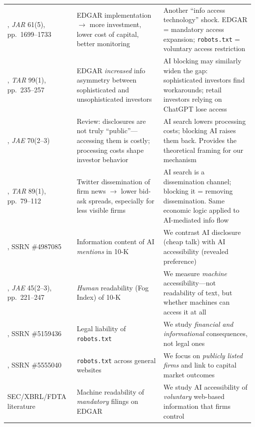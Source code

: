 \documentclass[12pt,a4paper]{article}
\begin{document}
\begin{table}[htbp]
\begin{tabularx}{\textwidth}{p{3.8cm}p{3.2cm}X}
\addlinespace
\citet{GoldsteinYangZuo2023}, \emph{JAR} 61(5), pp.\ 1699--1733 & EDGAR implementation $\to$ more investment, lower cost of capital, better monitoring & Another ``info access technology'' shock. EDGAR = mandatory access expansion; \texttt{robots.txt} = voluntary access restriction \\
\addlinespace
\citet{Gomez2024}, \emph{TAR} 99(1), pp.\ 235--257 & EDGAR \emph{increased} info asymmetry between sophisticated and unsophisticated investors & AI blocking may similarly widen the gap: sophisticated investors find workarounds; retail investors relying on ChatGPT lose access \\
\addlinespace
\citet{BlankespoorDeHaanMarinovic2020}, \emph{JAE} 70(2--3) & Review: disclosures are not truly ``public''---accessing them is costly; processing costs shape investor behavior & AI search lowers processing costs; blocking AI raises them back. Provides the theoretical framing for our mechanism \\
\addlinespace
\citet{BlankespoorMillerWhite2014}, \emph{TAR} 89(1), pp.\ 79--112 & Twitter dissemination of firm news $\to$ lower bid-ask spreads, especially for less visible firms & AI search is a dissemination channel; blocking it = removing dissemination. Same economic logic applied to AI-mediated info flow \\
\addlinespace
\citet{CaoLiuQiuZhao2024}, SSRN \#4987085 & Information content of AI \emph{mentions} in 10-K & We contrast AI disclosure (cheap talk) with AI accessibility (revealed preference) \\
\addlinespace
\citet{Li2008}, \emph{JAE} 45(2--3), pp.\ 221--247 & \emph{Human} readability (Fog Index) of 10-K & We measure \emph{machine} accessibility---not readability of text, but whether machines can access it at all \\
\addlinespace
\citet{ChangHe2025}, SSRN \#5159436 & Legal liability of \texttt{robots.txt} & We study \emph{financial and informational} consequences, not legal ones \\
\addlinespace
\citet{Reitinger2025}, SSRN \#5555040 & \texttt{robots.txt} across general websites & We focus on \emph{publicly listed firms} and link to capital market outcomes \\
\addlinespace
SEC/XBRL/FDTA literature & Machine readability of \emph{mandatory} filings on EDGAR & We study AI accessibility of \emph{voluntary} web-based information that firms control \\
\bottomrule
\end{tabularx}
\end{table}
\end{document}
